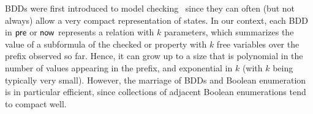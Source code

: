 \vspace{1.5ex}
 BDDs were first introduced to model checking~\cite{McMillan} since they can often (but not always) allow
a very compact representation of states.
In our context, each BDD in $\mathsf{pre}$ or $\mathsf{now}$
represents a relation with $k$ parameters, which summarizes
the value of a subformula of the checked \PFLTL{} or
\EPFLTL{} property
with $k$ free variables
over the prefix observed so
far. Hence, it can grow up to a size that is polynomial in the number of values appearing
in the prefix, and exponential in $k$ (with $k$ being
typically very small). However, the marriage of BDDs and Boolean enumeration is in particular
efficient, since collections of adjacent Boolean enumerations tend to compact well. 









